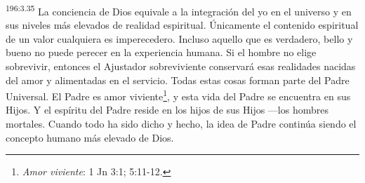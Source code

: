 \par 
\textsuperscript{196:3.35} La conciencia de Dios equivale a la integración del yo en el universo y en sus niveles más elevados de realidad espiritual. Únicamente el contenido espiritual de un valor cualquiera es imperecedero. Incluso aquello que es verdadero, bello y bueno no puede perecer en la experiencia humana. Si el hombre no elige sobrevivir, entonces el Ajustador sobreviviente conservará esas realidades nacidas del amor y alimentadas en el servicio. Todas estas cosas forman parte del Padre Universal. El Padre es amor viviente\footnote{\textit{Amor viviente}: 1 Jn 3:1; 5:11-12.}, y esta vida del Padre se encuentra en sus Hijos. Y el espíritu del Padre reside en los hijos de sus Hijos ---los hombres mortales. Cuando todo ha sido dicho y hecho, la idea de Padre continúa siendo el concepto humano más elevado de Dios.